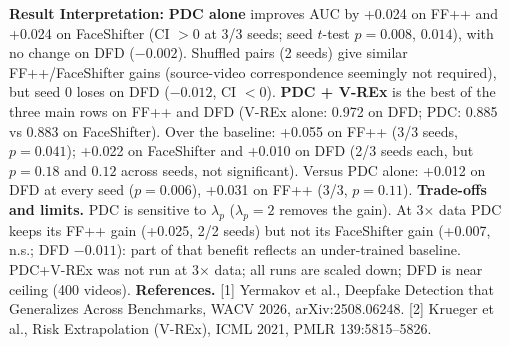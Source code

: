 \documentclass[8pt,a4paper]{article}
\begin{document}
\vspace{-5pt}

\textbf{Result Interpretation:}
\textbf{PDC alone} improves AUC by +0.024 on FF++ and +0.024 on FaceShifter (CI $>0$ at 3/3 seeds; seed $t$-test $p{=}0.008$, $0.014$), with no change on DFD ($-0.002$). Shuffled pairs (2 seeds) give similar FF++/FaceShifter gains (source-video correspondence seemingly not required), but seed 0 loses on DFD ($-0.012$, CI $<0$). \textbf{PDC + V-REx} is the best of the three main rows on FF++ and DFD (V-REx alone: 0.972 on DFD; PDC: 0.885 vs 0.883 on FaceShifter). Over the baseline: +0.055 on FF++ (3/3 seeds, $p{=}0.041$); +0.022 on FaceShifter and +0.010 on DFD (2/3 seeds each, but $p{=}0.18$ and $0.12$ across seeds, not significant). Versus PDC alone: +0.012 on DFD at every seed ($p{=}0.006$), +0.031 on FF++ (3/3, $p{=}0.11$).
\textbf{Trade-offs and limits.} PDC is sensitive to $\lambda_p$ ($\lambda_p{=}2$ removes the gain). At 3$\times$ data PDC keeps its FF++ gain (+0.025, 2/2 seeds) but not its FaceShifter gain (+0.007, n.s.; DFD $-0.011$): part of that benefit reflects an under-trained baseline. PDC+V-REx was not run at 3$\times$ data; all runs are scaled down; DFD is near ceiling (400 videos).
\textbf{References.} [1] Yermakov et al., Deepfake Detection that Generalizes Across Benchmarks, WACV 2026, arXiv:2508.06248. [2] Krueger et al., Risk Extrapolation (V-REx), ICML 2021, PMLR 139:5815--5826.
\end{document}
